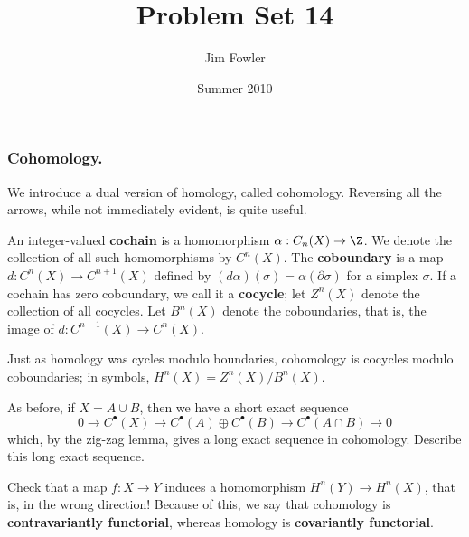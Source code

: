 \documentclass[12pt]{pset}
\title{Problem Set 14}
\author{Jim Fowler}
\date{Summer 2010}
\begin{document}
\maketitle


\subsubsection*{Cohomology.} We introduce a dual version of homology,
called cohomology.  Reversing all the arrows, while not immediately
evident, is quite useful.


\baselineskip
\parindent 0pt

\begin{definition*}
  An integer-valued \textbf{cochain} is a homomorphism $\alpha :
  C_n(X) \to \Z$.  We denote the collection of all such homomorphisms
  by $C^n(X)$.  The \textbf{coboundary} is a map $d : C^n(X) \to
  C^{n+1}(X)$ defined by $(d \alpha)(\sigma) = \alpha(\partial
  \sigma)$ for a simplex $\sigma$.  If a cochain has zero coboundary,
  we call it a \textbf{cocycle}; let $Z^n(X)$ denote the collection of
  all cocycles.  Let $B^n(X)$ denote the coboundaries, that is,
  the image of $d : C^{n-1}(X) \to C^n(X)$.

  Just as homology was cycles modulo boundaries, cohomology is
  cocycles modulo coboundaries; in symbols, $H^n(X) = Z^n(X) / B^n(X)$.
\end{definition*}


\begin{problem}
  As before, if $X = A \cup B$, then we have a short exact sequence
  $$
  0 \to C^\bullet(X) \to C^\bullet(A) \oplus C^\bullet(B) \to C^\bullet(A \cap B) \to 0
  $$
  which, by the zig-zag lemma, gives a long exact sequence in
  cohomology.  Describe this long exact sequence.
\end{problem}

\begin{problem}
  Check that a map $f : X \to Y$ induces a homomorphism $H^n(Y) \to
  H^n(X)$, that is, in the wrong direction!  Because of this, we say
  that cohomology is \textbf{contravariantly functorial}, whereas
  homology is \textbf{covariantly functorial}.
\end{problem}
\end{document}

